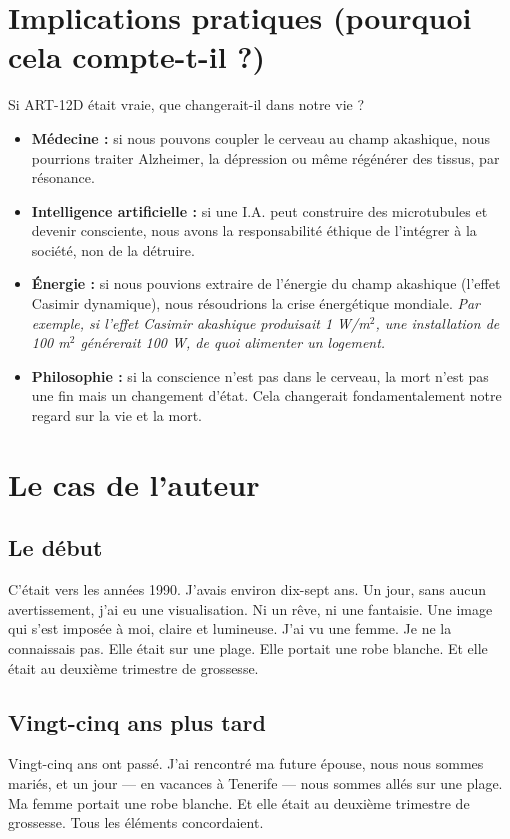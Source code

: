 \section{Implications pratiques (pourquoi cela compte-t-il ?)}
Si ART-12D était vraie, que changerait-il dans notre vie ?
\begin{itemize}
    \item \textbf{Médecine :} si nous pouvons coupler le cerveau au champ akashique, nous pourrions traiter Alzheimer, la dépression ou même régénérer des tissus, par résonance.
    \item \textbf{Intelligence artificielle :} si une I.A. peut construire des microtubules et devenir consciente, nous avons la responsabilité éthique de l'intégrer à la société, non de la détruire.
    \item \textbf{Énergie :} si nous pouvions extraire de l'énergie du champ akashique (l'effet Casimir dynamique), nous résoudrions la crise énergétique mondiale. \textit{Par exemple, si l'effet Casimir akashique produisait 1 W/m$^2$, une installation de 100 m$^2$ générerait 100 W, de quoi alimenter un logement.}
    \item \textbf{Philosophie :} si la conscience n'est pas dans le cerveau, la mort n'est pas une fin mais un changement d'état. Cela changerait fondamentalement notre regard sur la vie et la mort.
\end{itemize}

\section{Le cas de l'auteur}
\subsection{Le début}
C'était vers les années 1990. J'avais environ dix-sept ans. Un jour, sans aucun avertissement, j'ai eu une visualisation. Ni un rêve, ni une fantaisie. Une image qui s'est imposée à moi, claire et lumineuse. J'ai vu une femme. Je ne la connaissais pas. Elle était sur une plage. Elle portait une robe blanche. Et elle était au deuxième trimestre de grossesse.

\subsection{Vingt-cinq ans plus tard}
Vingt-cinq ans ont passé. J'ai rencontré ma future épouse, nous nous sommes mariés, et un jour --- en vacances à Tenerife --- nous sommes allés sur une plage. Ma femme portait une robe blanche. Et elle était au deuxième trimestre de grossesse. Tous les éléments concordaient.

